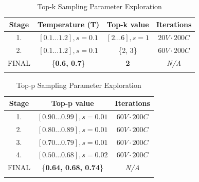 \begin{table}[p]
    \begin{center}
    \caption{Top-k Sampling Parameter Exploration}
    \vspace{6pt}
    \bgroup
    \def\arraystretch{1.3}
    \label{tab:top-k-param-eval}
    \begin{tabular}{|c|c|c|c|}
        \hline
        \textbf{Stage} & \textbf{Temperature (T)} & \textbf{Top-k value} & \textbf{Iterations} \\\hline\hline
        1. & $[0.1 \ldots 1.2], s=0.1$ & $[2 \ldots 6], s=1$ & $20V \cdot 200C$ \\\hline
        2. & $[0.1 \ldots 1.2], s=0.1$ & \{2, 3\} & $60V \cdot 200C$ \\\hline
        FINAL & \{\textbf{0.6, 0.7}\} & \textbf{2} & \textit{N/A}
        \\\whline
    \end{tabular}
    \egroup
    \end{center}
\end{table}

\begin{table}[p]
    \begin{center}
    \caption{Top-p Sampling Parameter Exploration}
    \vspace{6pt}
    \bgroup
    \def\arraystretch{1.3}
    \label{tab:top-p-param-eval}
    \begin{tabular}{|c|c|c|}
        \hline
        \textbf{Stage} & \textbf{Top-p value} & \textbf{Iterations} \\\hline\hline
        1. & $[0.90 \ldots 0.99], s=0.01$ & $60V \cdot 200C$ \\\hline
        2. & $[0.80 \ldots 0.89], s=0.01$ & $60V \cdot 200C$ \\\hline
        3. & $[0.70 \ldots 0.79], s=0.01$ & $60V \cdot 200C$ \\\hline
        4. & $[0.50 \ldots 0.68], s=0.02$ & $60V \cdot 200C$ \\\hline
        FINAL & \{\textbf{0.64, 0.68, 0.74}\} & \textit{N/A}
        \\\whline
    \end{tabular}
    \egroup
    \end{center}
\end{table}

